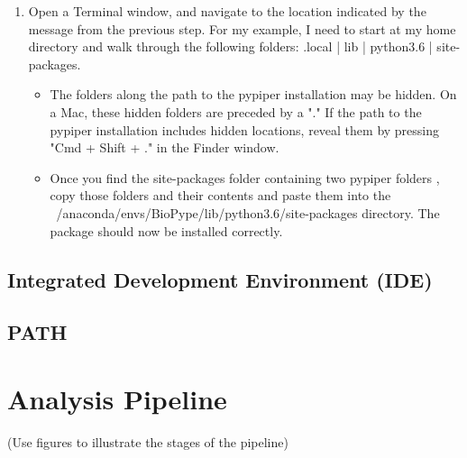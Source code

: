 \begin{enumerate}
\begin{enumerate}
            \item Open a Terminal window, and navigate to the location indicated by the message from the previous step. For my example, I need to start at my home directory and walk through the following folders: .local | lib | python3.6 | site-packages. 
            \begin{itemize}
                \item The folders along the path to the pypiper installation may be hidden. On a Mac, these hidden folders are preceded by a "." If the path to the pypiper installation includes hidden locations, reveal them by pressing "Cmd + Shift + ." in the Finder window.
            \item Once you find the site-packages folder containing two pypiper folders , copy those folders and their contents and paste them into the ~/anaconda/envs/BioPype/lib/python3.6/site-packages directory. The package should now be installed correctly.  
            \marginlabel{}
            \end{itemize}
        \end{enumerate}    
    \end{enumerate}

\subsection{Integrated Development Environment (IDE)}
%
\subsection{PATH}
\section{Analysis Pipeline}
(Use figures to illustrate the stages of the pipeline)

